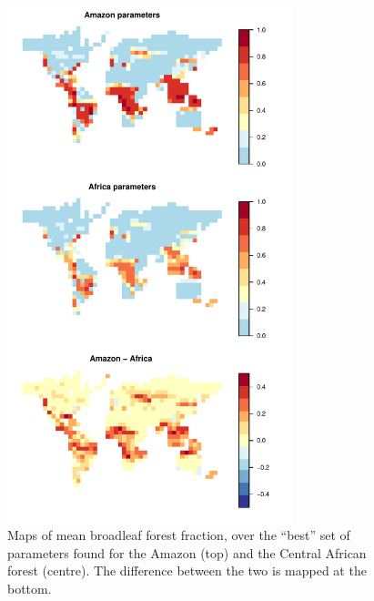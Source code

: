 \documentclass[esd, article]{copernicus} %
\begin{document}
\begin{figure}[t]
\includegraphics[width=8.3cm]{graphics/best_X_maps.pdf}
\caption{Maps of mean broadleaf forest fraction, over the ``best'' set of parameters found for the Amazon (top) and the Central African forest (centre). The difference between the two is mapped at the bottom.}
\label{fig:best_X_maps}
\end{figure}
\end{document}
